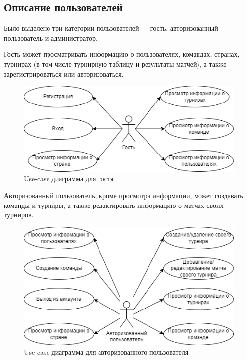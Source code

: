 \subsection{Описание пользователей}
Было выделено три категории пользователей --- гость, авторизованный пользователь и администратор.

Гость может просматривать информацию о пользователях, командах, странах, турнирах (в том числе турнирную таблицу и результаты матчей), а также зарегистрироваться или авторизоваться.
\begin{figure}
  \centering
  \includegraphics[scale=0.7]{inc/ppo}
  \caption{Use-case диаграмма для гостя}
  \label{img:ppo}
\end{figure}

Авторизованный пользователь, кроме просмотра информации, может создавать команды и турниры, а также
редактировать информацию о матчах своих турниров.
\begin{figure}
  \centering
  \includegraphics[scale=0.7]{inc/ppo1}
  \caption{Use-case диаграмма для авторизованного пользователя}
  \label{img:ppo1}
\end{figure}

